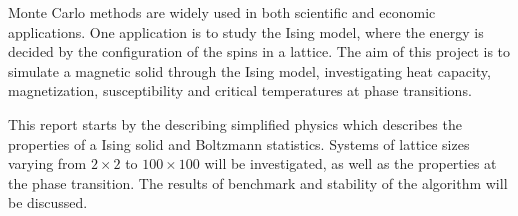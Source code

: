 

Monte Carlo methods are widely used in both scientific and economic applications. One application is to study the Ising model, where the energy is decided by the configuration of the spins in a lattice. The aim of this project is to simulate a magnetic solid through the Ising model, investigating heat capacity, magnetization, susceptibility and critical temperatures at phase transitions. 

This report starts by the describing simplified physics which describes the properties of a Ising solid and Boltzmann statistics. Systems of lattice sizes varying from $ 2\times 2 $ to $ 100 \times 100 $ will be investigated, as well as the properties at the phase transition. The results of benchmark and stability of the algorithm will be discussed. 
